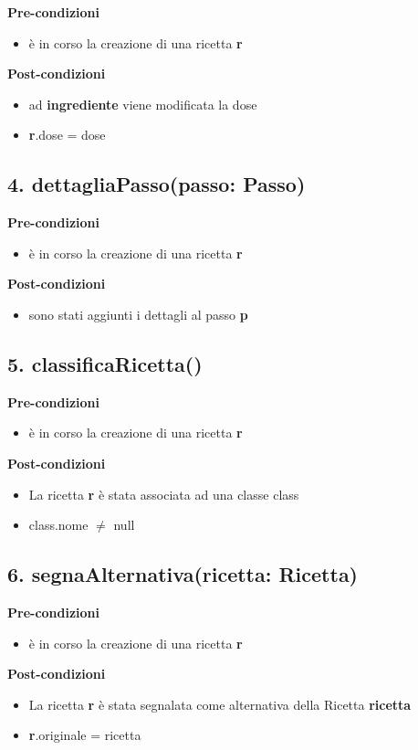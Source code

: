 \textbf{Pre-condizioni}
\begin{itemize}
  \item è in corso la creazione di una ricetta  \textbf{r}
\end{itemize}
\textbf{Post-condizioni}
\begin{itemize}
  \item ad  \textbf{ingrediente} viene modificata la dose
  \item \textbf{r}.dose = dose
\end{itemize}

\subsection*{4. dettagliaPasso(passo: Passo)}

\textbf{Pre-condizioni}
\begin{itemize}
  \item è in corso la creazione di una ricetta  \textbf{r}
\end{itemize}
\textbf{Post-condizioni}
\begin{itemize}
  \item sono stati aggiunti i dettagli al passo  \textbf{p}
\end{itemize}

\subsection*{5. classificaRicetta()}

\textbf{Pre-condizioni}
\begin{itemize}
  \item è in corso la creazione di una ricetta  \textbf{r}
\end{itemize}
\textbf{Post-condizioni}
\begin{itemize}
  \item La ricetta  \textbf{r} è stata associata ad una classe class
  \item class.nome $\neq$ null
\end{itemize}

\subsection*{6. segnaAlternativa(ricetta: Ricetta)}

\textbf{Pre-condizioni}
\begin{itemize}
  \item è in corso la creazione di una ricetta  \textbf{r}
\end{itemize}
\textbf{Post-condizioni}
\begin{itemize}
  \item La ricetta  \textbf{r} è stata segnalata come alternativa della Ricetta  \textbf{ricetta}
  \item \textbf{r}.originale = ricetta
\end{itemize}

